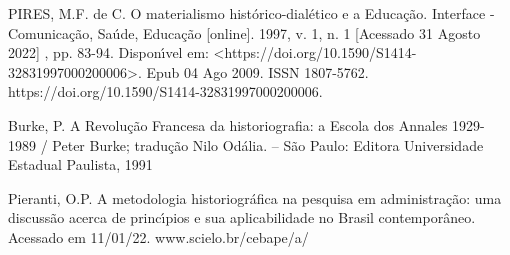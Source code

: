 \documentclass[
12pt,		%
openright,	%
twoside,  %
a4paper,			%
chapter=TITLE,		%
english,			%
french,				%
spanish,			%
brazil				%
]{USPSC-classe/USPSC}
\begin{document}
\begin{flushleft}
\begin{flushleft}
\begin{flushleft}
\begin{flushleft}
[Pires, 2009] PIRES, M.F. de C. O materialismo hist\'orico-dial\'etico e a Educa\c{c}\~ao. Interface - Comunica\c{c}\~ao, Sa\'ude, Educa\c{c}\~ao [online]. 1997, v. 1, n. 1 [Acessado 31 Agosto 2022] , pp. 83-94. Dispon\'{\i}vel em: <https://doi.org/10.1590/S1414-32831997000200006>. Epub 04 Ago 2009. ISSN 1807-5762. https://doi.org/10.1590/S1414-32831997000200006.
\end{flushleft}


\end{flushleft}


\end{flushleft}


\end{flushleft}


\begin{flushleft}
\begin{flushleft}
\begin{flushleft}
\begin{flushleft}
[Burke, 1991] Burke, P. A Revolu\c{c}\~ao Francesa da historiografia: a Escola dos Annales 1929-1989 / Peter Burke; tradu\c{c}\~ao Nilo Od\'alia. – S\~ao Paulo: Editora Universidade Estadual Paulista, 1991
\end{flushleft}


\end{flushleft}


\end{flushleft}


\end{flushleft}


\begin{flushleft}
\begin{flushleft}
\begin{flushleft}
\begin{flushleft}
[PIERANTI, 2022] Pieranti, O.P. A metodologia historiogr\'afica na pesquisa em administra\c{c}\~ao: uma discuss\~ao acerca de princ\'{\i}pios e sua aplicabilidade no Brasil contempor\^aneo. Acessado em 11/01/22. www.scielo.br/cebape/a/
\end{flushleft}


\end{flushleft}


\end{flushleft}


\end{flushleft}
\end{document}
